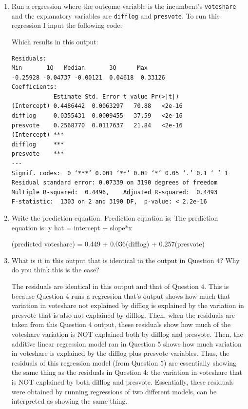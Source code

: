 \documentclass[12pt,letterpaper]{article}
\begin{document}
	\begin{enumerate}
		\item Run a regression where the outcome variable is the incumbent's \texttt{voteshare} and the explanatory variables are \texttt{difflog} and \texttt{presvote}.
To run this regression I input the following code:

Which results in this output:
	\begin{verbatim}
Residuals:     
Min       1Q   Median       3Q      Max 
-0.25928 -0.04737 -0.00121  0.04618  0.33126 
Coefficients:             
          	Estimate Std. Error t value Pr(>|t|)
(Intercept) 0.4486442  0.0063297   70.88   <2e-16
difflog     0.0355431  0.0009455   37.59   <2e-16
presvote    0.2568770  0.0117637   21.84   <2e-16               
(Intercept) ***
difflog     ***
presvote    ***
---
Signif. codes:  0 ‘***’ 0.001 ‘**’ 0.01 ‘*’ 0.05 ‘.’ 0.1 ‘ ’ 1
Residual standard error: 0.07339 on 3190 degrees of freedom
Multiple R-squared:  0.4496,	Adjusted R-squared:  0.4493 
F-statistic:  1303 on 2 and 3190 DF,  p-value: < 2.2e-16		
\end{verbatim} 				
		
		
			\vspace{2cm}
		\item Write the prediction equation.	
Prediction equation is:
The prediction equation is:
y hat = intercept + slope*x

(predicted voteshare) = 0.449 + 0.036(difflog) + 0.257(presvote)			
		
\vspace{5cm}
		\item What is it in this output that is identical to the output in Question 4? Why do you think this is the case?

The residuals are identical in this output and that of Question 4. This is because Question 4 runs a regression that's output shows how much that variation in voteshare not explained by difflog is explained by the variation in presvote that is also not explained by difflog. Then, when the residuals are taken from this Question 4 output, these residuals show how much of the voteshare variation is NOT explained both by difflog and presvote. 
Then, the additive linear regression model ran in Question 5 shows how much  variation in voteshare is explained by the difflog plus presvote variables. Thus, the residuals of this regression model (from Question 5) are essentially showing the same thing as the residuals in Question 4: the variation in voteshare that is NOT explained by both difflog and presvote. Essentially, these residuals were obtained by running regressions of two different models, can be interpreted as showing the same thing.
	\end{enumerate}
\end{document}
